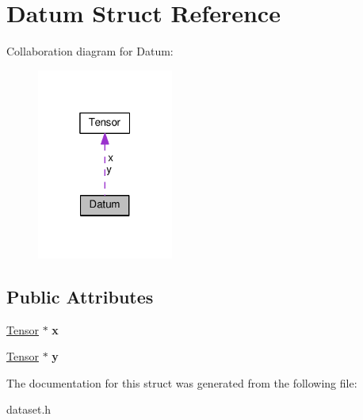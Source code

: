 \hypertarget{structDatum}{}\section{Datum Struct Reference}
\label{structDatum}


Collaboration diagram for Datum\+:
\nopagebreak
\begin{figure}[H]
\begin{center}
\leavevmode
\includegraphics[width=127pt]{structDatum__coll__graph}
\end{center}
\end{figure}
\subsection*{Public Attributes}
\begin{DoxyCompactItemize}
\item 
\hyperlink{structTensor}{Tensor} $\ast$ {\bfseries x}\hypertarget{structDatum_a4122bf5e7a2709d3dc50185198e5852e}{}\label{structDatum_a4122bf5e7a2709d3dc50185198e5852e}

\item 
\hyperlink{structTensor}{Tensor} $\ast$ {\bfseries y}\hypertarget{structDatum_aeb7df532867627568e927b47c9ea9dd0}{}\label{structDatum_aeb7df532867627568e927b47c9ea9dd0}

\end{DoxyCompactItemize}


The documentation for this struct was generated from the following file\+:\begin{DoxyCompactItemize}
\item 
dataset.\+h\end{DoxyCompactItemize}
